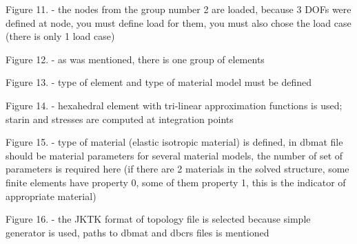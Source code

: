 \documentclass{article}
\begin{document}
\noindent
Figure 11. - the nodes from the group number 2 are loaded, because 3 DOFs were defined at node,
you must define load for them, you must also chose the load case (there is only 1 load case)

\noindent
Figure 12. - as was mentioned, there is one group of elements

\noindent
Figure 13. - type of element and type of material model must be defined

\noindent
Figure 14. - hexahedral element with tri-linear approximation functions is used; starin and stresses
are computed at integration points

\noindent
Figure 15. - type of material (elastic isotropic material) is defined, in dbmat file should be
material parameters for several material models, the number of set of parameters is required here
(if there are 2 materials in the solved structure, some finite elements have property 0, some of
them property 1, this is the indicator of appropriate material)

\noindent
Figure 16. - the JKTK format of topology file is selected because simple generator is used,
paths to dbmat and dbcrs files is mentioned
\end{document}
